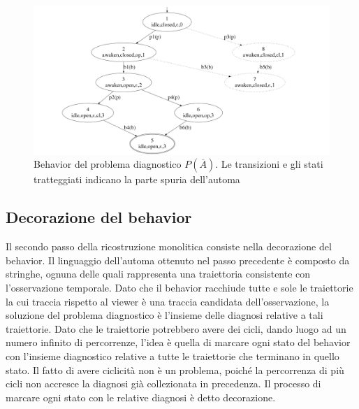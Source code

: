 \begin{figure}[htbp]
\centering
\includegraphics[scale=0.15]{./Img/sa/bhv_s.png}
\caption{Behavior del problema diagnostico $P(\overline{A})$. Le transizioni e gli stati tratteggiati indicano la parte spuria dell'automa}
\label{fig:bhv}
\end{figure}

\subsection{Decorazione del behavior}
Il secondo passo della ricostruzione monolitica consiste nella decorazione del behavior. Il linguaggio dell'automa ottenuto nel passo precedente è composto da stringhe, ognuna delle quali rappresenta una traiettoria consistente con l'osservazione temporale. Dato che il behavior racchiude tutte e sole le traiettorie la cui traccia rispetto al viewer è una traccia candidata dell'osservazione, la soluzione del problema diagnostico è l'insieme delle diagnosi relative a tali traiettorie. Dato che le traiettorie potrebbero avere dei cicli, dando luogo ad un numero infinito di percorrenze, l'idea è quella di marcare ogni stato del behavior con l'insieme diagnostico relative a tutte le traiettorie che terminano in quello stato. Il fatto di avere ciclicità non è un problema, poiché la percorrenza di più cicli non accresce la diagnosi già collezionata in precedenza. Il processo di marcare ogni stato con le relative diagnosi è detto decorazione.

